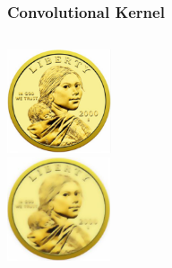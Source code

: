 \documentclass[xcolor={dvipsnames}]{beamer}
\begin{document}







\frame
{
 \frametitle{Convolutional Kernel}

\begin{columns}
\begin{column}{.25\textwidth}
{\includegraphics[height=1.2in]{stuff/dn1.png}}\\{\includegraphics[height=1.2in]{stuff/dn2.png}}\
\end{column}
\begin{column}{.75\textwidth}
\end{column}
\end{columns}


}



 
\end{document}

